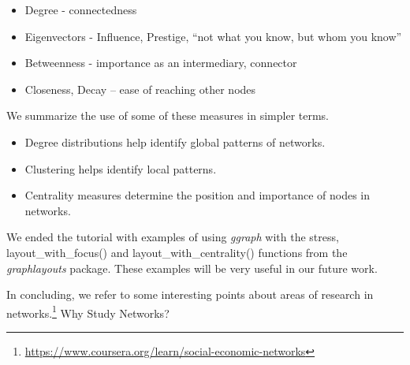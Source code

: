 \documentclass[
]{article}
\providecommand{\tightlist}{%
  \setlength{\itemsep}{0pt}\setlength{\parskip}{0pt}}
\begin{document}
\begin{itemize}
\tightlist
\item
  Degree - connectedness
\item
  Eigenvectors - Influence, Prestige, ``not what you know, but whom you know''
\item
  Betweenness - importance as an intermediary, connector
\item
  Closeness, Decay -- ease of reaching other nodes
\end{itemize}

We summarize the use of some of these measures in simpler terms.

\begin{itemize}
\tightlist
\item
  Degree distributions help identify global patterns of networks.\\
\item
  Clustering helps identify local patterns.
\item
  Centrality measures determine the position and importance of nodes in networks.
\end{itemize}

We ended the tutorial with examples of using \emph{ggraph} with the stress, layout\_with\_focus() and layout\_with\_centrality() functions from the \emph{graphlayouts} package. These examples will be very useful in our future work.

In concluding, we refer to some interesting points about areas of research in networks.\footnote{\url{https://www.coursera.org/learn/social-economic-networks}}
Why Study Networks?
\end{document}
